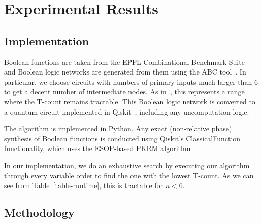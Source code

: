 \section{Experimental Results}
\label{Sec:exp}

\subsection{Implementation}
Boolean functions are taken from the EPFL Combinational Benchmark Suite~\cite{bib-epfl} and Boolean logic networks are generated from them using the ABC tool~\cite{bib-abc}. In particular, we choose circuits with numbers of primary inputs much larger than 6 to get a decent number of intermediate nodes.  As in~\cite{bib-barenco-elementary}, this represents a range where the T-count remains tractable. This Boolean logic network is converted to a quantum circuit implemented in Qiskit~\cite{bib-qiskit}, including any uncomputation logic.

The algorithm is implemented in Python. Any exact (non-relative phase) synthesis of Boolean functions is conducted using Qiskit's ClassicalFunction functionality, which uses the ESOP-based PKRM algorithm~\cite{bib-pkrm}. 

In our implementation, we do an exhaustive search by executing our algorithm through every variable order to find the one with the lowest T-count. As we can see from Table~\ref{table-runtime}, this is tractable for $n < 6$.

\subsection{Methodology} 

